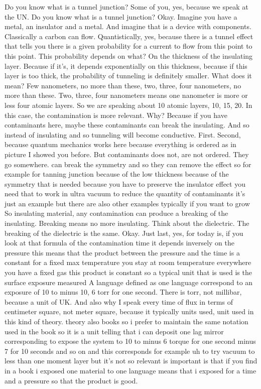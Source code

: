 Do you know what is a tunnel junction? Some of you, yes, because we speak at the UN. Do you know what is a tunnel junction? Okay. Imagine you have a metal, an insulator and a metal. And imagine that is a device with components. Classically a carbon can flow. Quantistically, yes, because there is a tunnel effect that tells you there is a given probability for a current to flow from this point to this point. This probability depends on what? On the thickness of the insulating layer. Because if it's, it depends exponentially on this thickness, because if this layer is too thick, the probability of tunneling is definitely smaller. What does it mean? Few nanometers, no more than these, two, three, four nanometers, no more than these. Two, three, four nanometers means one nanometer is more or less four atomic layers. So we are speaking about 10 atomic layers, 10, 15, 20. In this case, the contamination is more relevant. Why? Because if you have contaminants here, maybe these contaminants can break the insulating. And so instead of insulating and so tunneling will become conductive. First. Second, because quantum mechanics works here because everything is ordered as in picture I showed you before. But contaminants does not, are not ordered. They go somewhere. can break the symmetry and so they can remove the effect so for example for tanning junction because of the low thickness because of the symmetry that is needed because you have to preserve the insulator effect you need that to work in ultra vacuum to reduce the quantity of contaminants it's just an example but there are also other examples typically if you want to grow So insulating material, any contamination can produce a breaking of the insulating. Breaking means no more insulating. Think about the dielectric. The breaking of the dielectric is the same. Okay. Just last, yes, for today is, if you look at that formula of the contamination time it depends inversely on the pressure this means that the product between the pressure and the time is a constant for a fixed max temperature you stay at room temperature everywhere you have a fixed gas this product is constant so a typical unit that is used is the surface exposure measured A language defined as one language correspond to an exposure of 10 to minus 10, 6 torr for one second. There is torr, not millibar, because a unit of UK. And also why I speak every time of flux in terms of centimeter square, not meter square, because it typically units used, unit used in this kind of theory. theory also books so i prefer to maintain the same notation used in the book so it is a unit telling that i can deposit one lag mirror corresponding to expose the system to 10 to minus 6 torque for one second minus 7 for 10 seconds and so on and this corresponds for example uh to try vacuum to less than one moment layer but it's not so relevant is important is that if you find in a book i exposed one material to one language means that i exposed for a time and a pressure so that the product is good.
